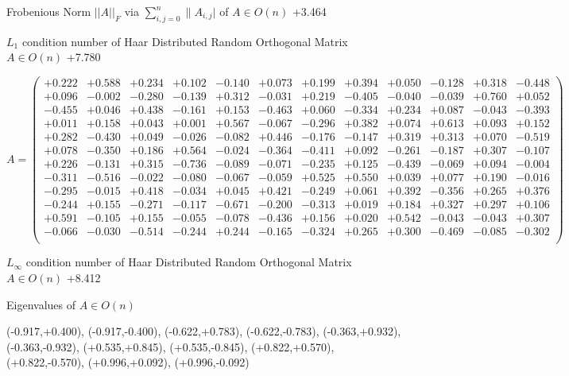 \documentclass[9pt]{article}
\theoremstyle{plain}
\theoremstyle{definition}
\theoremstyle{remark}
\numberwithin{equation}{section}
\begin{document}
Frobenious Norm  $||A||_{\textit{F}}$ via $\sum\limits_{i,j =0}^{n} \|A_{i,j}|$   of  $A \in O(n)$  +3.464

$L_1$ condition number of Haar Distributed Random Orthogonal Matrix $A \in O(n)$ +7.780

$A = \left(
\begin{array}{
cccccccccccc}
+0.222 & +0.588 & +0.234 & +0.102 & -0.140 & +0.073 & +0.199 & +0.394 & +0.050 & -0.128 & +0.318 & -0.448 \\
+0.096 & -0.002 & -0.280 & -0.139 & +0.312 & -0.031 & +0.219 & -0.405 & -0.040 & -0.039 & +0.760 & +0.052 \\
-0.455 & +0.046 & +0.438 & -0.161 & +0.153 & -0.463 & +0.060 & -0.334 & +0.234 & +0.087 & -0.043 & -0.393 \\
+0.011 & +0.158 & +0.043 & +0.001 & +0.567 & -0.067 & -0.296 & +0.382 & +0.074 & +0.613 & +0.093 & +0.152 \\
+0.282 & -0.430 & +0.049 & -0.026 & -0.082 & +0.446 & -0.176 & -0.147 & +0.319 & +0.313 & +0.070 & -0.519 \\
+0.078 & -0.350 & +0.186 & +0.564 & -0.024 & -0.364 & -0.411 & +0.092 & -0.261 & -0.187 & +0.307 & -0.107 \\
+0.226 & -0.131 & +0.315 & -0.736 & -0.089 & -0.071 & -0.235 & +0.125 & -0.439 & -0.069 & +0.094 & -0.004 \\
-0.311 & -0.516 & -0.022 & -0.080 & -0.067 & -0.059 & +0.525 & +0.550 & +0.039 & +0.077 & +0.190 & -0.016 \\
-0.295 & -0.015 & +0.418 & -0.034 & +0.045 & +0.421 & -0.249 & +0.061 & +0.392 & -0.356 & +0.265 & +0.376 \\
-0.244 & +0.155 & -0.271 & -0.117 & -0.671 & -0.200 & -0.313 & +0.019 & +0.184 & +0.327 & +0.297 & +0.106 \\
+0.591 & -0.105 & +0.155 & -0.055 & -0.078 & -0.436 & +0.156 & +0.020 & +0.542 & -0.043 & -0.043 & +0.307 \\
-0.066 & -0.030 & -0.514 & -0.244 & +0.244 & -0.165 & -0.324 & +0.265 & +0.300 & -0.469 & -0.085 & -0.302 \\
\end{array}
\right)$ \newline 

$L_{\infty}$ condition number of Haar Distributed Random Orthogonal Matrix $A \in O(n)$ +8.412

Eigenvalues of $A \in O(n)$

(-0.917,+0.400), (-0.917,-0.400), (-0.622,+0.783), (-0.622,-0.783), (-0.363,+0.932), (-0.363,-0.932), (+0.535,+0.845), (+0.535,-0.845), (+0.822,+0.570), (+0.822,-0.570), (+0.996,+0.092), (+0.996,-0.092)
\end{document}
